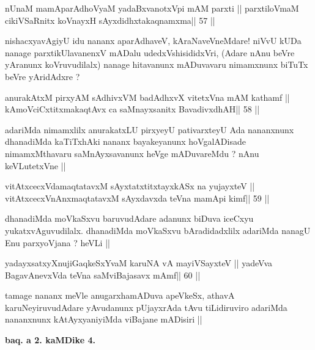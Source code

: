 \begin{shl}
nUnaM mamAparAdhoV\s yaM yadaBxvanotxV\s pi mAM parxti ||
parxtiloVmaM cikiVSaRnitx koV\s nayxH sAyxdidhxtakaqnamxma\hfill || 57 ||
\end{shl}

\begin{artha}
nishacxyavAgiyU idu nananx aparAdhaveV, kAraNaveVneMdare! niVvU kUDa
nanage parxtikUlavanenxV mADalu udedxVshisididxVri, (Adare nAnu
beVre yAranunx koVruvudilalx) nanage  hitavanunx mADuvavaru nimamxnunx
biTuTx beVre yAridAdxre ?
\end{artha}

\begin{shl}
anurakAtxM pirxyAM sAdhivxVM badAdhxvX vitetxVna mAM kathamf ||
kAmoVciCxtitxmakaqtAvx ca saMnayxsanitx BavadivxdhAH\hfill || 58 ||
\end{shl}

\begin{artha}
adariMda nimamxlilx anurakatxLU pirxyeyU pativarxteyU Ada nananxnunx
dhanadiMda kaTiTxhAki nananx bayakeyanunx hoVgalADisade nimamxMthavaru
saMnAyxsavanunx heVge mADuvareMdu ? nAnu keVLutetxVne ||
\end{artha}

\begin{shl}
vitAtxcecxVdamaqtatavxM sAyxtatxtitxtayxkASx na yujayxteV ||
vitAtxcecxVnAnxmaqtatavxM sAyxdavxda teVna mamApi kimf\hfill || 59 ||
\end{shl}

\begin{artha}
dhanadiMda moVkaSxvu baruvudAdare adanunx biDuva iceCxyu
yukatxvAguvudilalx. dhanadiMda moVkaSxvu bAradidadxlilx adariMda
nanagU Enu parxyoVjana ? heVLi ||
\end{artha}

\begin{shl}
yadayxsatxyXnujiGaqkeSxYvaM karuNA vA mayiVSayxteV ||
yadeVva BagavAnevxVda teVna saMviBajasavx mAmf\hfill || 60 ||
\end{shl}

\begin{artha}
tamage nananx meVle anugarxhamADuva apeVkeSx, athavA
karuNeyiruvudAdare yAvudanunx pUjayxrAda tAvu tiLidiruviro adariMda
nananxnunx kAtAyxyaniyiMda viBajane mADisiri ||
\end{artha}

\begin{center}
\textbf{baq. a 2. kaMDike 4.}
\end{center}

